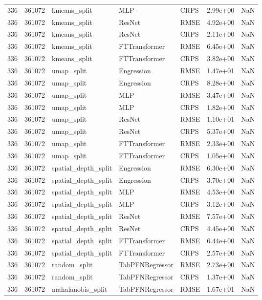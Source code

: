 \begin{tabular}{rrlllrr}
336 & 361072 & kmeans\_split & MLP & CRPS & 2.99e+00 & NaN \\
336 & 361072 & kmeans\_split & ResNet & RMSE & 4.92e+00 & NaN \\
336 & 361072 & kmeans\_split & ResNet & CRPS & 2.11e+00 & NaN \\
336 & 361072 & kmeans\_split & FTTransformer & RMSE & 6.45e+00 & NaN \\
336 & 361072 & kmeans\_split & FTTransformer & CRPS & 3.82e+00 & NaN \\
336 & 361072 & umap\_split & Engression & RMSE & 1.47e+01 & NaN \\
336 & 361072 & umap\_split & Engression & CRPS & 8.28e+00 & NaN \\
336 & 361072 & umap\_split & MLP & RMSE & 3.47e+00 & NaN \\
336 & 361072 & umap\_split & MLP & CRPS & 1.82e+00 & NaN \\
336 & 361072 & umap\_split & ResNet & RMSE & 1.10e+01 & NaN \\
336 & 361072 & umap\_split & ResNet & CRPS & 5.37e+00 & NaN \\
336 & 361072 & umap\_split & FTTransformer & RMSE & 2.33e+00 & NaN \\
336 & 361072 & umap\_split & FTTransformer & CRPS & 1.05e+00 & NaN \\
336 & 361072 & spatial\_depth\_split & Engression & RMSE & 6.30e+00 & NaN \\
336 & 361072 & spatial\_depth\_split & Engression & CRPS & 3.70e+00 & NaN \\
336 & 361072 & spatial\_depth\_split & MLP & RMSE & 4.53e+00 & NaN \\
336 & 361072 & spatial\_depth\_split & MLP & CRPS & 3.12e+00 & NaN \\
336 & 361072 & spatial\_depth\_split & ResNet & RMSE & 7.57e+00 & NaN \\
336 & 361072 & spatial\_depth\_split & ResNet & CRPS & 4.45e+00 & NaN \\
336 & 361072 & spatial\_depth\_split & FTTransformer & RMSE & 6.44e+00 & NaN \\
336 & 361072 & spatial\_depth\_split & FTTransformer & CRPS & 2.57e+00 & NaN \\
336 & 361072 & random\_split & TabPFNRegressor & RMSE & 2.73e+00 & NaN \\
336 & 361072 & random\_split & TabPFNRegressor & CRPS & 1.37e+00 & NaN \\
336 & 361072 & mahalanobis\_split & TabPFNRegressor & RMSE & 1.67e+01 & NaN \\

\end{tabular}
